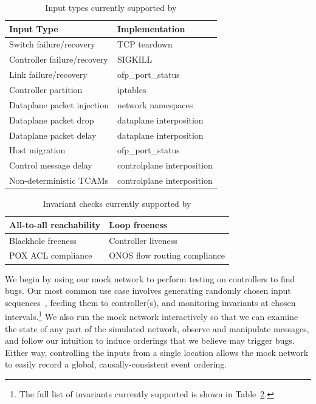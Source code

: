 \begin{table}
\centering
\begin{tabular}{|l|l|}
\hline
Input Type &  Implementation \\
\hline
\hline
Switch failure/recovery & TCP teardown \\
\hline
Controller failure/recovery & SIGKILL \\
\hline
Link failure/recovery & ofp\_port\_status \\
\hline
Controller partition & iptables \\
\hline
Dataplane packet injection & network namespaces \\
\hline
Dataplane packet drop & dataplane interposition \\
\hline
Dataplane packet delay & dataplane interposition \\
\hline
Host migration & ofp\_port\_status \\
\hline
Control message delay & controlplane interposition \\
\hline
Non-deterministic TCAMs & controlplane interposition \\
\hline
\end{tabular}
\caption{Input types currently supported by \projectname}
\label{tab:inputs}
\end{table}

\begin{table}
\centering
\begin{tabular}{|l|l|}
\hline
All-to-all reachability & Loop freeness \\
\hline
Blackhole freeness & Controller liveness \\
\hline
POX ACL compliance & ONOS flow routing compliance \\
\hline
\end{tabular}
\caption{Invariant checks currently supported by \projectname}
\label{tab:invariants}
\end{table}

We begin by using our mock network to perform testing on controllers to find
bugs. Our most common use case involves generating randomly chosen input
sequences~\cite{Miller:1990:ESR:96267.96279}, feeding them to controller(s),
and monitoring
invariants at chosen intervals.\footnote{The full list of invariants currently
supported is shown in Table~\ref{tab:invariants}.}
We also run the mock network interactively
so that we can examine the state of any part of the simulated network,
observe and manipulate messages, and follow our
intuition to induce orderings that we believe may trigger bugs.
Either way, controlling the inputs from a single location
allows the mock network to easily record a global, causally-consistent
event ordering.

